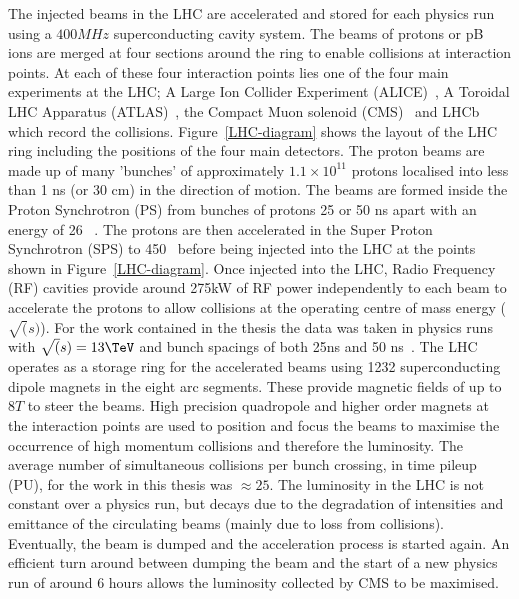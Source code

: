 The injected beams in the LHC are accelerated and stored for each physics run using 
a $400MHz$ superconducting cavity system. The beams of protons or pB ions 
are merged at four sections around the ring to enable collisions at interaction points.
At each of these four interaction points lies one of the four main 
experiments at the LHC; A Large Ion Collider Experiment (ALICE)~\cite{ALICE},
A Toroidal LHC Apparatus (ATLAS)~\cite{ATLAS}, the Compact Muon solenoid (CMS)~\cite{CMS}
and LHCb which record the collisions. Figure~\ref{LHC-diagram} shows the layout of the LHC ring including
the positions of the four main detectors. The proton beams are made up of many 'bunches' of approximately $1.1\times10^{11}$
protons localised into less than 1 ns (or 30 cm) in the direction of motion.
The beams are formed inside the Proton Synchrotron (PS) from bunches of protons 25 or 50 ns apart with an energy of 26 \GeV~. 
The protons are then accelerated in the Super Proton Synchrotron (SPS) to 450 \GeV~before being injected into the LHC at
the points shown in Figure~\ref{LHC-diagram}. Once injected into the LHC, Radio Frequency (RF) cavities 
provide around 275kW of RF power independently to each beam to accelerate the protons to allow collisions
at the operating centre of mass energy ($\sqrt(s)$). For the work contained in the thesis 
the data was taken in physics runs with $\sqrt(s) = 13\TeV$ and bunch spacings of both 25ns and 50 ns~\cite{LHC}. 
The LHC operates as a storage ring for the accelerated beams using 1232 
superconducting dipole magnets in the eight arc segments. These provide magnetic fields of up to $8T$ to steer the beams. 
High precision quadropole and higher order magnets at the interaction points are used to position and focus the beams to 
maximise the occurrence of high momentum collisions and therefore the luminosity. The average number of simultaneous collisions
per bunch crossing, in time pileup (PU), for the work in this thesis was $\approx25$.
The luminosity in the LHC is not constant over a physics run, but decays due to the degradation 
of intensities and emittance of the circulating beams (mainly due to loss from collisions). Eventually,
the beam is dumped and the acceleration process is started again. An efficient turn around between
dumping the beam and the start of a new physics run of 
around 6 hours allows the luminosity collected by CMS to be maximised. 

